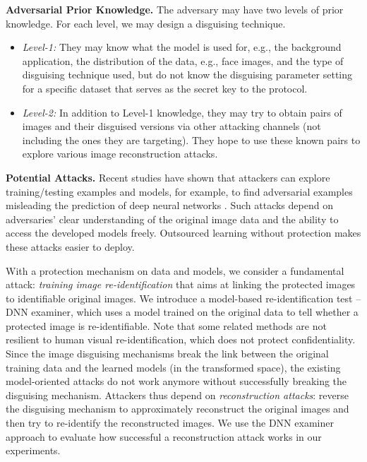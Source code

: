 \documentclass[conference]{IEEEtran}
\begin{document}
\textbf{Adversarial Prior Knowledge.} The adversary may have two levels of prior knowledge. For each level, we may design a disguising technique. 
\begin{itemize}
\item \emph{Level-1:} They may know what the model is used for, e.g., the background application, the distribution of the data, e.g., face images, and the type of disguising technique used, but do not know the disguising parameter setting for a specific dataset that serves as the secret key to the protocol. 
\item \emph{Level-2:} In addition to Level-1 knowledge, they may try to obtain pairs of images and their disguised versions via other attacking channels (not including the ones they are targeting). They hope to use these known pairs to explore various image reconstruction attacks.
\end{itemize}



\textbf{Potential Attacks.} Recent studies have shown that attackers can explore training/testing examples and models, for example, to find adversarial examples misleading the prediction of deep neural networks \cite{chakraborty18, raff19}. Such attacks depend on adversaries' clear understanding of the original image data and the ability to access the developed models freely. Outsourced learning without protection makes these attacks easier to deploy. 

With a protection mechanism on data and models, we consider a fundamental attack: \emph{training image re-identification} that aims at linking the protected images to identifiable original images. We introduce a model-based re-identification test -- DNN examiner, which uses a model trained on the original data to tell whether a protected image is re-identifiable. Note that some related methods \cite{fan18,li17} are not resilient to human visual re-identification, which does not protect confidentiality. Since the image disguising mechanisms break the link between the original training data and the learned models (in the transformed space), the existing model-oriented attacks do not work anymore without successfully breaking the disguising mechanism. Attackers thus depend on \emph{reconstruction attacks}: reverse the disguising mechanism to approximately reconstruct the original images and then try to re-identify the reconstructed images. We use the DNN examiner approach to evaluate how successful a reconstruction attack works in our experiments. 
\end{document}
